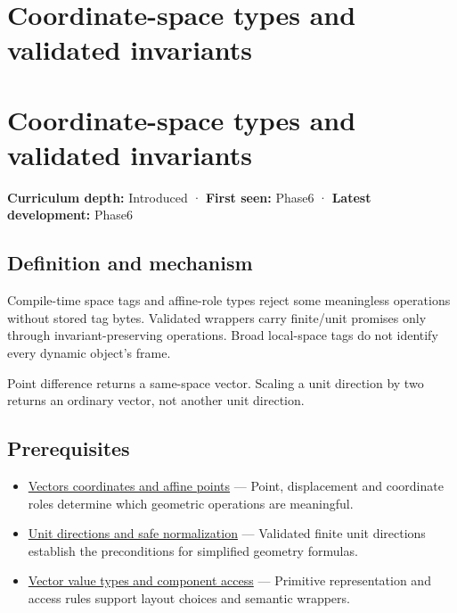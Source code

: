 \hypertarget{appendix-380a220e2529}{}
\section*{Coordinate-space types and validated invariants}
\section{Coordinate-space types and validated invariants}\label{appendix-380a220e2529-coordinate-space-types-and-validated-invariants}

\textbf{Curriculum depth:} Introduced · \textbf{First seen:} Phase6 · \textbf{Latest development:} Phase6

\subsection{Definition and mechanism}\label{appendix-380a220e2529-definition-and-mechanism}

Compile-time space tags and affine-role types reject some meaningless operations without stored tag bytes. Validated wrappers carry finite/unit promises only through invariant-preserving operations. Broad local-space tags do not identify every dynamic object's frame.

Point difference returns a same-space vector. Scaling a unit direction by two returns an ordinary vector, not another unit direction.

\subsection{Prerequisites}\label{appendix-380a220e2529-prerequisites}

\begin{itemize}
\tightlist
\item
  \hyperref[appendix-0659864c0aa3]{Vectors coordinates and affine points} --- Point, displacement and coordinate roles determine which geometric operations are meaningful.
\item
  \hyperref[appendix-f744e41b95b4]{Unit directions and safe normalization} --- Validated finite unit directions establish the preconditions for simplified geometry formulas.
\item
  \hyperref[appendix-37a39984ba66]{Vector value types and component access} --- Primitive representation and access rules support layout choices and semantic wrappers.
\end{itemize}

